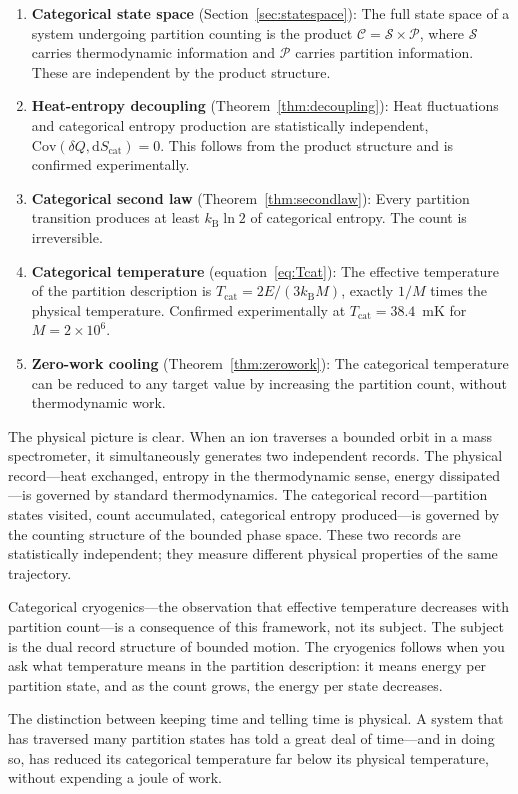 \documentclass[twocolumn,10pt]{article}
\newcommand{\kB}{k_{\mathrm{B}}}
\newcommand{\Tcat}{T_{\mathrm{cat}}}
\newcommand{\dQ}{\delta Q}
\newcommand{\dS}{\mathrm{d}S}
\newcommand{\Cov}{\mathrm{Cov}}
\begin{document}
\begin{enumerate}
    \item \textbf{Categorical state space} (Section~\ref{sec:statespace}): The full state space of a system undergoing partition counting is the product $\mathcal{C} = \mathcal{S} \times \mathcal{P}$, where $\mathcal{S}$ carries thermodynamic information and $\mathcal{P}$ carries partition information. These are independent by the product structure.

    \item \textbf{Heat-entropy decoupling} (Theorem~\ref{thm:decoupling}): Heat fluctuations and categorical entropy production are statistically independent, $\Cov(\dQ, \dS_{\mathrm{cat}}) = 0$. This follows from the product structure and is confirmed experimentally.

    \item \textbf{Categorical second law} (Theorem~\ref{thm:secondlaw}): Every partition transition produces at least $\kB\ln 2$ of categorical entropy. The count is irreversible.

    \item \textbf{Categorical temperature} (equation~\ref{eq:Tcat}): The effective temperature of the partition description is $\Tcat = 2E/(3\kB M)$, exactly $1/M$ times the physical temperature. Confirmed experimentally at $\Tcat = 38.4$~mK for $M = 2 \times 10^6$.

    \item \textbf{Zero-work cooling} (Theorem~\ref{thm:zerowork}): The categorical temperature can be reduced to any target value by increasing the partition count, without thermodynamic work.
\end{enumerate}

The physical picture is clear. When an ion traverses a bounded orbit in a mass spectrometer, it simultaneously generates two independent records. The physical record---heat exchanged, entropy in the thermodynamic sense, energy dissipated---is governed by standard thermodynamics. The categorical record---partition states visited, count accumulated, categorical entropy produced---is governed by the counting structure of the bounded phase space. These two records are statistically independent; they measure different physical properties of the same trajectory.

Categorical cryogenics---the observation that effective temperature decreases with partition count---is a consequence of this framework, not its subject. The subject is the dual record structure of bounded motion. The cryogenics follows when you ask what temperature means in the partition description: it means energy per partition state, and as the count grows, the energy per state decreases.

The distinction between keeping time and telling time is physical. A system that has traversed many partition states has told a great deal of time---and in doing so, has reduced its categorical temperature far below its physical temperature, without expending a joule of work.



\end{document}
